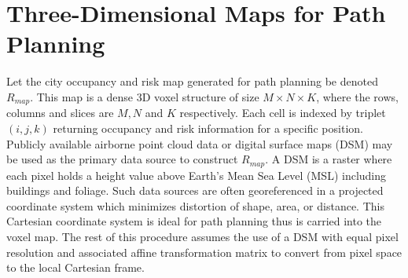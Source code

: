 


\section{Three-Dimensional Maps for Path Planning}\label{sec:ch5_cost_maps}\label{sec:ch5_occupancy_map}



Let the city occupancy and risk map generated for path planning be denoted $R_{map}$. This map is a dense 3D voxel structure of size $M\times N \times K$, where the rows, columns and slices are $M, N$ and $K$ respectively. Each cell is indexed by triplet $(i, j, k)$  returning occupancy and risk information for a specific position. Publicly available airborne point cloud data or digital surface maps (DSM) may be used as the primary data source to construct $R_{map}$. A DSM is a raster where each pixel holds a height value above Earth's Mean Sea Level (MSL) including buildings and foliage. Such data sources are often georeferenced in a projected coordinate system which minimizes distortion of shape, area, or distance. This Cartesian coordinate system is ideal for path planning thus is carried into the voxel map. The rest of this procedure assumes the use of a DSM with equal pixel resolution and associated affine transformation matrix to convert from pixel space to the local Cartesian frame.

